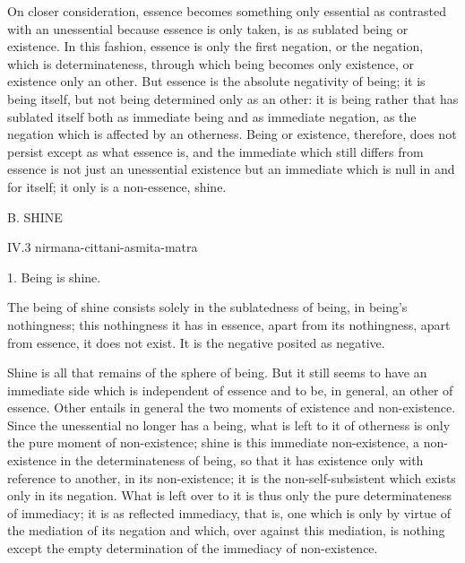 On closer consideration, essence becomes something
only essential as contrasted with an unessential
because essence is only taken,
is as sublated being or existence.
In this fashion, essence is only the first negation,
or the negation, which is determinateness,
through which being becomes only existence,
or existence only an other.
But essence is the absolute negativity of being;
it is being itself, but not being determined only as an other:
it is being rather that has sublated itself both as immediate being
and as immediate negation, as the negation
which is affected by an otherness.
Being or existence, therefore, does not persist
except as what essence is,
and the immediate which still differs from essence is not just
an unessential existence but an immediate
which is null in and for itself;
it only is a non-essence, shine.

B. SHINE

IV.3
nirmana-cittani-asmita-matra

1. Being is shine.

The being of shine consists solely
in the sublatedness of being,
in being's nothingness;
this nothingness it has in essence,
apart from its nothingness,
apart from essence, it does not exist.
It is the negative posited as negative.

Shine is all that remains of the sphere of being.
But it still seems to have an immediate side
which is independent of essence and to be, in general,
an other of essence.
Other entails in general the two moments of existence and non-existence.
Since the unessential no longer has a being,
what is left to it of otherness is only the pure moment of non-existence;
shine is this immediate non-existence,
a non-existence in the determinateness of being,
so that it has existence only with reference to another,
in its non-existence;
it is the non-self-subsistent which exists only in its negation.
What is left over to it is thus only the pure determinateness of immediacy;
it is as reflected immediacy, that is, one which is
only by virtue of the mediation of its negation
and which, over against this mediation, is nothing
except the empty determination of the immediacy of non-existence.

